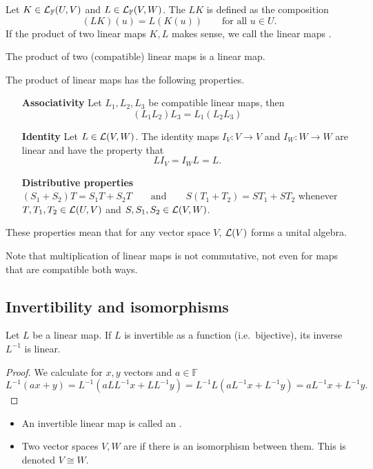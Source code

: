 \begin{definition}
Let $K\in \operatorname{\mathcal{L}}_\mathbb{F}(U,V)$ and $L\in \operatorname{\mathcal{L}}_\mathbb{F}(V,W)$. The  $LK$ is defined as the composition
\[ (LK)(u) = L(K(u)) \qquad \text{for all $u\in U$.} \]
If the product of two linear maps $K,L$ makes sense, we call the linear maps .
\end{definition}
\begin{proposition}
The product of two (compatible) linear maps is a linear map.
\end{proposition}
\begin{proposition}
The product of linear maps has the following properties. 
\begin{itemize}[leftmargin=4.2cm]
\item[\textbf{Associativity}] Let $L_1, L_2, L_3$ be compatible linear maps, then
\[ (L_1L_2)L_3 = L_1(L_2L_3) \]
\item[\textbf{Identity}] Let $L\in \operatorname{\mathcal{L}}(V,W)$. The identity maps $I_V:V\to V$ and $I_W:W\to W$ are linear and have the property that
\[ LI_V = I_W L = L. \]
\item[\textbf{Distributive properties}]
$ (S_1+S_2)T = S_1T + S_2T \qquad \text{and} \qquad S(T_1 + T_2) = ST_1 + ST_2 $
whenever $T,T_1, T_2 \in \operatorname{\mathcal{L}}(U,V)$ and $S,S_1, S_2\in \operatorname{\mathcal{L}}(V,W)$.
\end{itemize}
These properties mean that for any vector space $V$, $\operatorname{\mathcal{L}}(V)$ forms a unital algebra.
\end{proposition}
Note that multiplication of linear maps is not commutative, not even for maps that are compatible both ways.

\subsection{Invertibility and isomorphisms}
\begin{proposition} \label{inverseLinear}
Let $L$ be a linear map. If $L$ is invertible as a function (i.e.\ bijective), its inverse $L^{-1}$ is linear.
\end{proposition}
\begin{proof}
We calculate for $x,y$ vectors and $a\in\mathbb{F}$
\[ L^{-1}(ax + y) = L^{-1}(aLL^{-1}x + LL^{-1}y) = L^{-1}L(aL^{-1}x + L^{-1}y) = aL^{-1}x + L^{-1}y. \]
\end{proof}

\begin{definition}
\begin{itemize}
\item An invertible linear map is called an .
\item Two vector spaces $V,W$  are  if there is an isomorphism between them. This is denoted $V\cong W$.
\end{itemize}
\end{definition}

